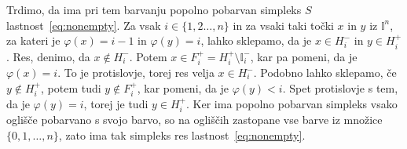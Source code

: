 \documentclass[mat1]{fmfdelo}
\newcommand{\I}{\mathbb I}
\newcommand{\0}{\underline{0}}
\begin{document}
\begin{dokaz}
Trdimo, da ima pri tem barvanju popolno pobarvan simpleks $S$ lastnost~\eqref{eq:nonempty}. 
Za vsak $i \in \{1, 2 \dots, n \}$ in za vsaki taki točki $x$ in $y$ iz $\I^n$, za kateri je $\varphi(x) = i - 1$ in $\varphi(y) = i$, lahko sklepamo, da je $x \in H_{i}^-$ in $y \in H_i^+$. Res, denimo, da  $x \notin H_{i}^-$. Potem  $x \in F_i^+ = H_{i}^+ \setminus \I_i^-$, kar pa pomeni, da je $\varphi(x) = i$. To je protislovje, torej res velja $x \in H_{i}^-$. Podobno lahko sklepamo, če $y \notin H_i^+$, potem tudi $y \notin F_i^+$, kar pomeni, da je $\varphi(y) < i$. Spet protislovje s tem, da je $\varphi(y) = i$, torej je tudi $y \in H_i^+$.
Ker ima popolno pobarvan simpleks vsako oglišče pobarvano s svojo barvo, so na ogliščih zastopane vse barve iz množice $\{ 0, 1, \dots, n \}$, zato ima tak simpleks res lastnost~\eqref{eq:nonempty}. 


\end{dokaz}
\end{document}
